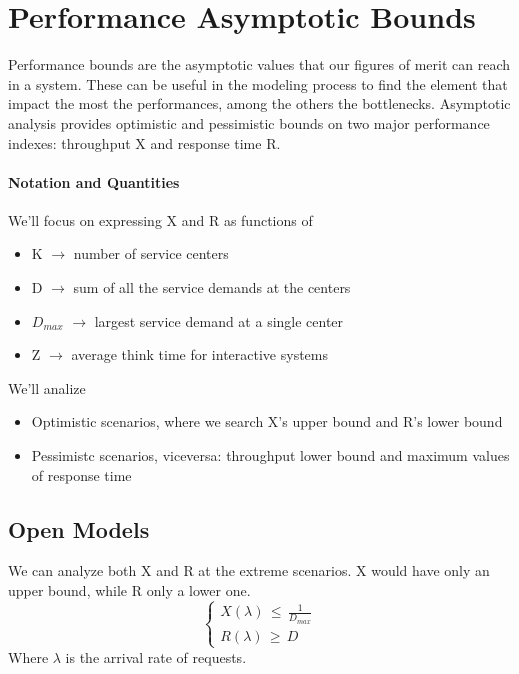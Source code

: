 \documentclass[10pt,a4paper]{article}
\begin{document}
		\section{Performance Asymptotic Bounds}
			Performance bounds are the asymptotic values that our figures of merit can reach in a system. These can be useful in the modeling process to find the element that impact the most the performances, among the others the bottlenecks. Asymptotic analysis provides optimistic and pessimistic bounds on two major performance indexes: throughput X and response time R.
			
			\paragraph{Notation and Quantities}
				We'll focus on expressing X and R as functions of
				\begin{itemize}
					\item K $\rightarrow$ number of service centers
					\item D $\rightarrow$ sum of all the service demands at the centers
					\item $D_{max}$ $\rightarrow$ largest service demand at a single center
					\item Z $\rightarrow$ average think time for interactive systems
				\end{itemize}
				We'll analize
				\begin{itemize}
					\item Optimistic scenarios, where we search X's upper bound and R's lower bound
					\item Pessimistc scenarios, viceversa: throughput lower bound and maximum values of response time
				\end{itemize}
			
			\subsection{Open Models}
				We can analyze both X and R at the extreme scenarios. X would have only an upper bound, while R only a lower one.
				\begin{equation}
					\begin{cases}
						X(\lambda) \,\leq\, \frac{1}{D_{max}}\\
						R(\lambda) \,\geq\, D
					\end{cases}
				\end{equation}
				Where $\lambda$ is the arrival rate of requests.
				
\end{document}
